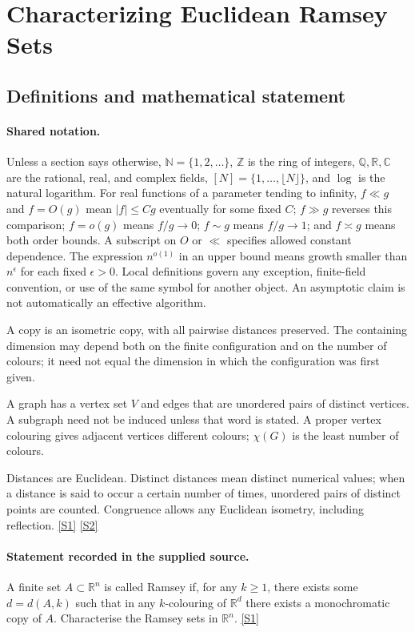 \documentclass[11pt,a4paper]{article}
\newcommand{\N}{\mathbb{N}}
\newcommand{\Z}{\mathbb{Z}}
\newcommand{\Q}{\mathbb{Q}}
\newcommand{\R}{\mathbb{R}}
\newcommand{\C}{\mathbb{C}}
\newcommand{\sref}[2]{\hyperlink{source:#1:#2}{[S#2]}}
\begin{document}
\section{Characterizing Euclidean Ramsey Sets}\label{statement}


\subsection{Definitions and mathematical statement}

\paragraph{Shared notation.}Unless a section says otherwise, $\N=\{1,2,\ldots\}$,
$\Z$ is the ring of integers, $\Q,\R,\C$ are the rational, real, and complex
fields, $[N]=\{1,\ldots,\lfloor N\rfloor\}$, and $\log$ is the natural
logarithm. For real functions of a parameter tending to infinity,
$f\ll g$ and $f=O(g)$ mean $|f|\leq Cg$ eventually for some fixed $C$;
$f\gg g$ reverses this comparison; $f=o(g)$ means $f/g\to0$;
$f\sim g$ means $f/g\to1$; and $f\asymp g$ means both order bounds.
A subscript on $O$ or $\ll$ specifies allowed constant dependence.
The expression $n^{o(1)}$ in an upper bound means growth smaller than
$n^\epsilon$ for each fixed $\epsilon>0$. Local definitions govern any
exception, finite-field convention, or use of the same symbol for another
object. An asymptotic claim is not automatically an effective algorithm.



A copy is an isometric copy, with all pairwise distances preserved. The containing dimension may depend both on the finite configuration and on the number of colours; it need not equal the dimension in which the configuration was first given.

A graph has a vertex set $V$ and edges that are unordered pairs of distinct vertices. A subgraph need not be induced unless that word is stated. A proper vertex colouring gives adjacent vertices different colours; $\chi(G)$ is the least number of colours.

Distances are Euclidean. Distinct distances mean distinct numerical values; when a distance is said to occur a certain number of times, unordered pairs of distinct points are counted. Congruence allows any Euclidean isometry, including reflection. \sref{statement}{1} \sref{statement}{2}

\paragraph{Statement recorded in the supplied source.}
A finite set $A\subset \mathbb{R}^n$ is called Ramsey if, for any $k\geq 1$, there exists some $d=d(A,k)$ such that in any $k$-colouring of $\mathbb{R}^d$ there exists a monochromatic copy of $A$. Characterise the Ramsey sets in $\mathbb{R}^n$. \sref{statement}{1}
\end{document}
